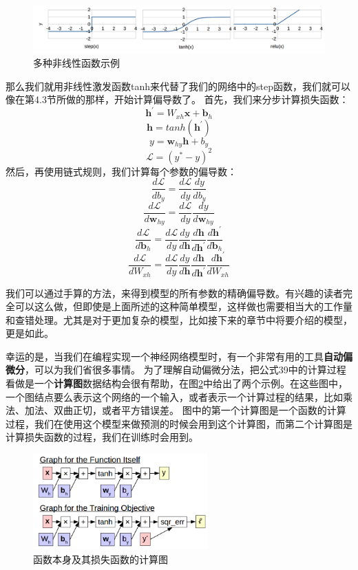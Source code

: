 \documentclass[10pt,a4paper]{ctexart}
\begin{document}
\begin{figure}[H]
\centering
\includegraphics[width=1\textwidth]{fig9.png}
\caption{多种非线性函数示例}
\label{fig:9}
\end{figure}

那么我们就用非线性激发函数tanh来代替了我们的网络中的step函数，我们就可以像在第4.3节所做的那样，开始计算偏导数了。
首先，我们来分步计算损失函数：
\[
 \textbf{h}^{'} = W_{xh}\textbf{x} + \textbf{b}_h
\]
\[
 \textbf{h} = tanh(\textbf{h}^{'})
\]
\[
 y = \textbf{w}_{hy} \textbf{h} + b_y
\]
\[
 \mathcal{L} = (y^* - y)^2
\]
然后，再使用链式规则，我们计算每个参数的偏导数：
\[
 \frac{d\mathcal{L}}{db_y} = \frac{d\mathcal{L}}{dy} \frac{dy}{db_y}
\]
\[
 \frac{d\mathcal{L}}{d\textbf{w}_{hy}} = \frac{d\mathcal{L}}{dy} \frac{dy}{d\textbf{w}_{hy}}
\]
\[
 \frac{d\mathcal{L}}{d\textbf{b}_h} = \frac{d\mathcal{L}}{dy} \frac{dy}{d\textbf{h}} \frac{d\textbf{h}}{d\textbf{h}^{'}} \frac{d\textbf{h}^{'}}{d\textbf{b}_h}
\]
\[
 \frac{d\mathcal{L}}{dW_{xh}} = \frac{d\mathcal{L}}{dy} \frac{dy}{d\textbf{h}} \frac{d\textbf{h}}{d\textbf{h}^{'}} \frac{d\textbf{h}^{'}}{dW_{xh}}
\]

我们可以通过手算的方法，来得到模型的所有参数的精确偏导数。有兴趣的读者完全可以这么做，但即使是上面所述的这种简单模型，这样做也需要相当大的工作量和查错处理。尤其是对于更加复杂的模型，比如接下来的章节中将要介绍的模型，更是如此。

幸运的是，当我们在编程实现一个神经网络模型时，有一个非常有用的工具\textbf{自动偏微分}\cite{wengert1964simple,andreas1991dif}，可以为我们省很多事情。
为了理解自动偏微分法，把公式39中的计算过程看做是一个\textbf{计算图}数据结构会很有帮助，在图\ref{fig:10}中给出了两个示例。在这些图中，一个图结点要么表示这个网络的一个输入，或者表示一个计算过程的结果，比如乘法、加法、双曲正切，或者平方错误差。
图中的第一个计算图是一个函数的计算过程，我们在使用这个模型来做预测的时候会用到这个计算图，而第二个计算图是计算损失函数的过程，我们在训练时会用到。

\begin{figure}[H]
\centering
\includegraphics[width=0.6\textwidth]{fig10.png}
\caption{函数本身及其损失函数的计算图}
\label{fig:10}
\end{figure}
\end{document}
